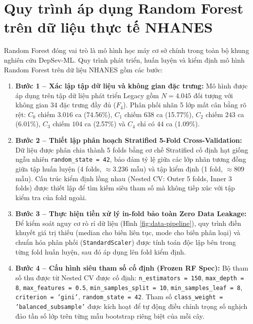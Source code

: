 \section{Quy trình áp dụng Random Forest trên dữ liệu thực tế NHANES}
\label{sec:xay-dung-random-forest}

Random Forest đóng vai trò là mô hình học máy cơ sở chính trong toàn bộ khung nghiên cứu DepSev-ML. Quy trình phát triển, huấn luyện và kiểm định mô hình Random Forest trên dữ liệu NHANES gồm các bước:

\begin{enumerate}
    \item \textbf{Bước 1 -- Xác lập tập dữ liệu và không gian đặc trưng:} 
    Mô hình được áp dụng trên tập dữ liệu phát triển Legacy gồm $N = 4.045$ đối tượng với không gian 34 đặc trưng đầy đủ ($F_4$). Phân phối nhãn 5 lớp mất cân bằng rõ rệt: $C_0$ chiếm $3.016$ ca (74.56\%), $C_1$ chiếm $638$ ca (15.77\%), $C_2$ chiếm $243$ ca (6.01\%), $C_3$ chiếm $104$ ca (2.57\%) và $C_4$ chỉ có $44$ ca (1.09\%).
    
    \item \textbf{Bước 2 -- Thiết lập phân hoạch Stratified 5-Fold Cross-Validation:} 
    Dữ liệu được phân chia thành 5 folds bằng cơ chế Stratified cố định hạt giống ngẫu nhiên \texttt{random\_state = 42}, bảo đảm tỷ lệ giữa các lớp nhãn tương đồng giữa tập huấn luyện (4 folds, $\approx 3.236$ mẫu) và tập kiểm định (1 fold, $\approx 809$ mẫu). Cấu trúc kiểm định lồng nhau (Nested CV: Outer 5 folds, Inner 3 folds) được thiết lập để tìm kiếm siêu tham số mà không tiếp xúc với tập kiểm tra của fold ngoài.
    
    \item \textbf{Bước 3 -- Thực hiện tiền xử lý in-fold bảo toàn Zero Data Leakage:} 
    Để kiểm soát nguy cơ rò rỉ dữ liệu (Hình \ref{fig:data-pipeline}), quy trình điền khuyết giá trị thiếu (median cho biến liên tục, mode cho biến phân loại) và chuẩn hóa phân phối (\texttt{StandardScaler}) được tính toán độc lập bên trong từng fold huấn luyện, sau đó áp dụng lên fold kiểm định.
    
    \item \textbf{Bước 4 -- Cấu hình siêu tham số cố định (Frozen RF Spec):} 
    Bộ tham số thu được từ Nested CV được cố định: \texttt{n\_estimators = 150}, \texttt{max\_depth = 8}, \texttt{max\_features = 0.5}, \texttt{min\_samples\_split = 10}, \texttt{min\_samples\_leaf = 8}, \texttt{criterion = 'gini'}, \texttt{random\_state = 42}. Tham số \texttt{class\_weight = 'balanced\_subsample'} được kích hoạt để tự động điều chỉnh trọng số nghịch đảo tần số lớp trên từng mẫu bootstrap riêng biệt của mỗi cây.
    

\end{enumerate}
